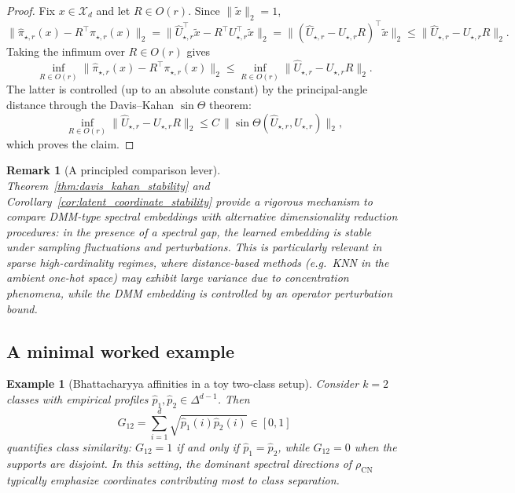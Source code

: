 \documentclass[preprint,11pt]{elsarticle}
\newtheorem{Remark}[Theorem]{Remark}
\newtheorem{Example}[Theorem]{Example}
\begin{document}
\begin{proof}
Fix $x\in\mathcal X_d$ and let $R\in O(r)$. Since $\|\widetilde x\|_2=1$,
\[
\|\widehat\pi_{\star,r}(x)-R^\top\pi_{\star,r}(x)\|_2
=
\|\widehat U_{\star,r}^\top\widetilde x-R^\top U_{\star,r}^\top\widetilde x\|_2
=
\|(\widehat U_{\star,r}-U_{\star,r}R)^\top \widetilde x\|_2
\le
\|\widehat U_{\star,r}-U_{\star,r}R\|_2.
\]
Taking the infimum over $R\in O(r)$ gives
\[
\inf_{R\in O(r)}\|\widehat\pi_{\star,r}(x)-R^\top\pi_{\star,r}(x)\|_2
\le
\inf_{R\in O(r)}\|\widehat U_{\star,r}-U_{\star,r}R\|_2.
\]
The latter is controlled (up to an absolute constant) by the principal-angle distance through the Davis–Kahan $\sin \Theta$ theorem:
\[
\inf_{R\in O(r)}\|\widehat U_{\star,r}-U_{\star,r}R\|_2
\le
C\,\|\sin\Theta(\widehat U_{\star,r},U_{\star,r})\|_2,
\]
which proves the claim.
\end{proof}

\begin{Remark}[A principled comparison lever]
Theorem~\ref{thm:davis_kahan_stability} and Corollary~\ref{cor:latent_coordinate_stability} provide a rigorous mechanism
to compare DMM-type spectral embeddings with alternative dimensionality reduction procedures:
in the presence of a spectral gap, the learned embedding is stable under sampling fluctuations and perturbations.
This is particularly relevant in sparse high-cardinality regimes, where distance-based methods (e.g.\ KNN in the ambient one-hot space)
may exhibit large variance due to concentration phenomena, while the DMM embedding is controlled by an operator perturbation bound.
\end{Remark}

\subsection{A minimal worked example}
\label{subsec:toy_example_bhattacharyya}

\begin{Example}[Bhattacharyya affinities in a toy two-class setup]
\label{ex:toy_bhattacharyya}
Consider $k=2$ classes with empirical profiles $\widehat p_1,\widehat p_2\in\Delta^{d-1}$.
Then
\[
G_{12}=\sum_{i=1}^d\sqrt{\widehat p_1(i)\widehat p_2(i)}\in[0,1]
\]
quantifies class similarity: $G_{12}=1$ if and only if $\widehat p_1=\widehat p_2$, while $G_{12}=0$ when the supports are disjoint.
In this setting, the dominant spectral directions of $\rho_{\mathrm{CN}}$ typically emphasize coordinates contributing most to class separation.
\end{Example}
\end{document}
